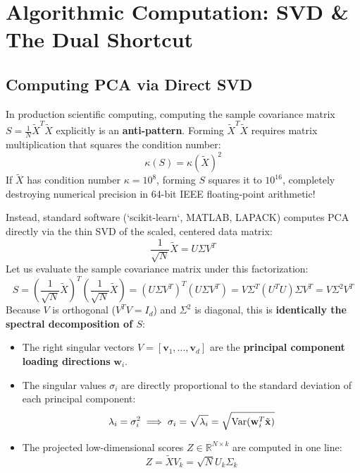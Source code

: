 \section{Algorithmic Computation: SVD \& The Dual Shortcut}

\subsection{Computing PCA via Direct SVD}
In production scientific computing, computing the sample covariance matrix $S = \frac{1}{N}\tilde{X}^T \tilde{X}$ explicitly is an \textbf{anti-pattern}. Forming $\tilde{X}^T \tilde{X}$ requires matrix multiplication that squares the condition number:
\begin{equation}
\kappa(S) = \kappa(\tilde{X})^2
\end{equation}
If $\tilde{X}$ has condition number $\kappa = 10^8$, forming $S$ squares it to $10^{16}$, completely destroying numerical precision in 64-bit IEEE floating-point arithmetic!

Instead, standard software (`scikit-learn`, MATLAB, LAPACK) computes PCA directly via the thin SVD of the scaled, centered data matrix:
\begin{equation}
\frac{1}{\sqrt{N}}\tilde{X} = U \Sigma V^T
\label{eq:pca_svd_direct}
\end{equation}
Let us evaluate the sample covariance matrix under this factorization:
\begin{equation}
S = \left(\frac{1}{\sqrt{N}}\tilde{X}\right)^T \left(\frac{1}{\sqrt{N}}\tilde{X}\right) = (U \Sigma V^T)^T (U \Sigma V^T) = V \Sigma^T (U^T U) \Sigma V^T = V \Sigma^2 V^T
\end{equation}
Because $V$ is orthogonal ($V^T V = I_d$) and $\Sigma^2$ is diagonal, this is \textbf{identically the spectral decomposition of $S$}:
\begin{itemize}
    \item The right singular vectors $V = [\mathbf{v}_1, \dots, \mathbf{v}_d]$ are the \textbf{principal component loading directions} $\mathbf{w}_i$.
    \item The singular values $\sigma_i$ are directly proportional to the standard deviation of each principal component:
    \begin{equation}
    \lambda_i = \sigma_i^2 \implies \sigma_i = \sqrt{\lambda_i} = \sqrt{\operatorname{Var}(\mathbf{w}_i^T \tilde{\mathbf{x}})}
    \end{equation}
    \item The projected low-dimensional scores $Z \in \mathbb{R}^{N \times k}$ are computed in one line:
    \begin{equation}
    Z = \tilde{X} V_k = \sqrt{N} U_k \Sigma_k
    \end{equation}
\end{itemize}

